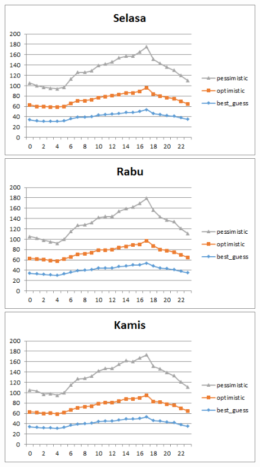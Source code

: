 \begin{figure}[H]
				\centering		
				\includegraphics[]{Gambar/selasasampel115052017.png}
				\includegraphics[]{Gambar/rabusampel115052017.png}
				\includegraphics[]{Gambar/kamissampel115052017.png}
			\end{figure}			
			
